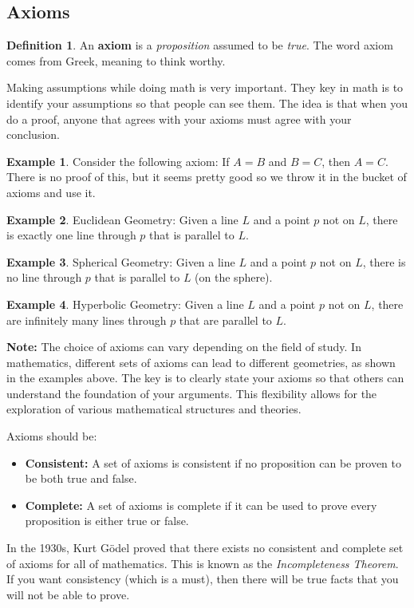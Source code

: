 \documentclass[11pt]{article}
\theoremstyle{definition}
\newtheorem{definition}{Definition}
\newtheorem{example}{Example}
\begin{document}
\subsection{Axioms}

\begin{definition}
  An \textbf{axiom} is a \textit{proposition} assumed to be \textit{true}. The word axiom comes from Greek, meaning to think worthy.
\end{definition}

Making assumptions while doing math is very important. They key in math is to identify your assumptions so that people can see them. The idea is that when you do a proof, anyone that agrees with your axioms must agree with your conclusion.

\begin{example}
  Consider the following axiom: If \( A = B \) and \( B = C \), then \( A = C \). There is no proof of this, but it seems pretty good so we throw it in the bucket of axioms and use it.
\end{example}

\begin{example}
  Euclidean Geometry: Given a line \( L \) and a point \( p \) not on \( L \), there is exactly one line through \( p \) that is parallel to \( L \).
\end{example}

\begin{example}
  Spherical Geometry: Given a line \( L \) and a point \( p \) not on \( L \), there is no line through \( p \) that is parallel to \( L \) (on the sphere).
\end{example}

\begin{example}
  Hyperbolic Geometry: Given a line \( L \) and a point \( p \) not on \( L \), there are infinitely many lines through \( p \) that are parallel to \( L \).
\end{example}

\textbf{Note:} The choice of axioms can vary depending on the field of study. In mathematics, different sets of axioms can lead to different geometries, as shown in the examples above. The key is to clearly state your axioms so that others can understand the foundation of your arguments. This flexibility allows for the exploration of various mathematical structures and theories.

Axioms should be:
\begin{itemize}
  \item \textbf{Consistent:} A set of axioms is consistent if no proposition can be proven to be both true and false.
  \item \textbf{Complete:} A set of axioms is complete if it can be used to prove every proposition is either true or false.
\end{itemize}

In the 1930s, Kurt Gödel proved that there exists no consistent and complete set of axioms for all of mathematics. This is known as the \textit{Incompleteness Theorem}. If you want consistency (which is a must), then there will be true facts that you will not be able to prove.
\end{document}
